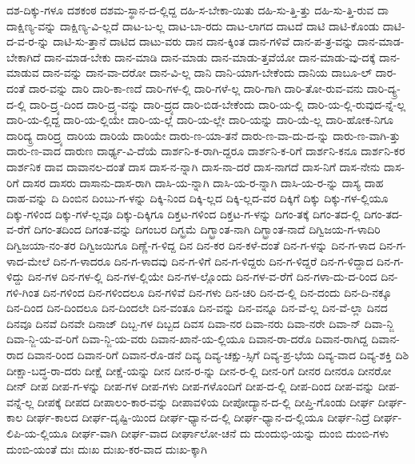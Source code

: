 {ದಶ-ದಿಕ್ಕು-ಗಳೂ
ದಶಕಂಠ
ದಶಮ-ಸ್ಥಾನ-ದ-ಲ್ಲಿದ್ದ
ದಹಿ-ಸ-ಬೇಕಾ-ಯಿತು
ದಹಿ-ಸು-ತ್ತಿ-ತ್ತು
ದಹಿ-ಸು-ತ್ತಿ-ರುವ
ದಾ
ದಾಕ್ಷಿಣ್ಯ-ವನ್ನು
ದಾಕ್ಷಿಣ್ಯ-ವಿ-ಲ್ಲದೆ
ದಾಟ-ಬ-ಲ್ಲ
ದಾಟ-ಬಾ-ರದು
ದಾಟ-ಲಾಗದ
ದಾಟದೆ
ದಾಟಿ
ದಾಟಿ-ಕೊಂಡು
ದಾಟಿ-ದ-ವ-ರ-ನ್ನು
ದಾಟಿ-ಸು-ತ್ತಾನೆ
ದಾಟಿದ
ದಾಟು-ವರು
ದಾನ
ದಾನ-ಕ್ಕಿಂತ
ದಾನ-ಗಳಿವೆ
ದಾನ-ಪ-ತ್ರ-ವನ್ನು
ದಾನ-ಮಾಡ-ಬೇಕಾಗಿದೆ
ದಾನ-ಮಾಡ-ಬೇಕು
ದಾನ-ಮಾಡಿ
ದಾನ-ಮಾಡು
ದಾನ-ಮಾಡು-ತ್ತವೆಯೋ
ದಾನ-ಮಾಡು-ವು-ದಕ್ಕೆ
ದಾನ-ಮಾಡುವ
ದಾನ-ವನ್ನು
ದಾನ-ವಾ-ದರೋ
ದಾನ-ವಿ-ಲ್ಲ
ದಾನಿ
ದಾನಿ-ಯಾಗ-ಬೇಕೆಂದು
ದಾನಿಯ
ದಾಬೂ-ಲ್
ದಾರ-ದಂತೆ
ದಾರ-ವನ್ನು
ದಾರಿ
ದಾರಿ-ಕಾ-ಣದೆ
ದಾರಿ-ಗಳ-ಲ್ಲಿ
ದಾರಿ-ಗಳೆ-ಲ್ಲ
ದಾರಿ-ಗಾಗಿ
ದಾರಿ-ತೋ-ರುವ-ವನು
ದಾರಿ-ದ್ಯ್ರ-ದ-ಲ್ಲಿ
ದಾರಿ-ದ್ರ್ಯ-ದಿಂದ
ದಾರಿ-ದ್ರ್ಯ-ವನ್ನು
ದಾರಿ-ದ್ರ್ಯದ
ದಾರಿ-ಬಿಡ-ಬೇಕೆಂದು
ದಾರಿ-ಯ-ಲ್ಲಿ
ದಾರಿ-ಯ-ಲ್ಲಿ-ರುವುದ-ನ್ನೆ-ಲ್ಲ
ದಾರಿ-ಯ-ಲ್ಲಿದ್ದ
ದಾರಿ-ಯ-ಲ್ಲಿಯೇ
ದಾರಿ-ಯ-ಲ್ಲೆ
ದಾರಿ-ಯ-ಲ್ಲೇ
ದಾರಿ-ಯನ್ನು
ದಾರಿ-ಯೆ-ಲ್ಲ
ದಾರಿ-ಹೋಕ-ನಿಗೂ
ದಾರಿದ್ಯ್ರ
ದಾರಿದ್ರ್ಯ
ದಾರಿಯ
ದಾರಿಯೆ
ದಾರಿಯೇ
ದಾರು-ಣ-ಯಾ-ತನೆ
ದಾರು-ಣ-ವಾ-ದು-ದ-ನ್ನು
ದಾರು-ಣ-ವಾಗಿ-ತ್ತು
ದಾರು-ಣ-ವಾದ
ದಾರುಣ
ದಾರ್ಢ್ಯ-ವಿ-ದೆಯೆ
ದಾರ್ಶನಿ-ಕ-ರಾಗಿ-ದ್ದರೂ
ದಾರ್ಶನಿ-ಕ-ರಿಗೆ
ದಾರ್ಶನಿ-ಕನೂ
ದಾರ್ಶನಿ-ಕರ
ದಾರ್ಶನಿಕ
ದಾವ
ದಾವಾನಲ-ದಂತೆ
ದಾಸ
ದಾಸ-ನ-ನ್ನಾಗಿ
ದಾಸ-ನಾ-ದರೆ
ದಾಸ-ನಾಗದೆ
ದಾಸ-ನಿಗೆ
ದಾಸ-ನೇನು
ದಾಸ-ರಿಗೆ
ದಾಸರ
ದಾಸರು
ದಾಸಾನು-ದಾಸ-ರಾಗಿ
ದಾಸಿ-ಯ-ನ್ನಾಗಿ
ದಾಸಿ-ಯ-ರ-ನ್ನಾಗಿ
ದಾಸಿ-ಯ-ರ-ನ್ನು
ದಾಸ್ಯ
ದಾಹ
ದಾಹ-ವನ್ನು
ದಿ
ದಿಂಬಿನ
ದಿಂಬು-ಗ-ಳನ್ನು
ದಿಕ್ಕಿ-ನಿಂದ
ದಿಕ್ಕಿ-ಲ್ಲದ
ದಿಕ್ಕಿ-ಲ್ಲದ-ವರ
ದಿಕ್ಕಿಗೆ
ದಿಕ್ಕು
ದಿಕ್ಕು-ಗಳ-ಲ್ಲಿಯೂ
ದಿಕ್ಕು-ಗಳಿಂದ
ದಿಕ್ಕು-ಗಳೆ-ಲ್ಲವೂ
ದಿಕ್ಕು-ದಿಕ್ಕಿಗೂ
ದಿಕ್ತಟ-ಗಳಿಂದ
ದಿಕ್ತಟ-ಗ-ಳನ್ನು
ದಿಗಂ-ತಕ್ಕೆ
ದಿಗಂ-ತದ-ಲ್ಲಿ
ದಿಗಂ-ತದ-ವ-ರೆಗೆ
ದಿಗಂ-ತದಿಂದ
ದಿಗಂತ-ವನ್ನು
ದಿಗಂಬರ
ದಿಗ್ಭ್ರಮೆ
ದಿಗ್ಭ್ರಾಂತ-ನಾಗಿ
ದಿಗ್ಭ್ರಾಂತ-ನಾದೆ
ದಿಗ್ವಿಜಯ-ಗ-ಳಾದಿರಿ
ದಿಗ್ವಿಜಯಾ-ನಂ-ತರ
ದಿಗ್ವಿಜಯಿಗೂ
ದಿಣ್ಣೆ-ಗ-ಳಿದ್ದ
ದಿನ
ದಿನ-ಕರ
ದಿನ-ಕಳೆ-ದಂತೆ
ದಿನ-ಗ-ಳನ್ನು
ದಿನ-ಗ-ಳಾದ
ದಿನ-ಗ-ಳಾದ-ಮೇಲೆ
ದಿನ-ಗ-ಳಾದರೂ
ದಿನ-ಗ-ಳಾದವು
ದಿನ-ಗ-ಳಿಗೆ
ದಿನ-ಗ-ಳಿದ್ದರು
ದಿನ-ಗ-ಳಿದ್ದರೆ
ದಿನ-ಗ-ಳಿದ್ದಾದ
ದಿನ-ಗ-ಳಿದ್ದು
ದಿನ-ಗಳ
ದಿನ-ಗಳ-ಲ್ಲಿ
ದಿನ-ಗಳ-ಲ್ಲಿಯೇ
ದಿನ-ಗಳ-ಲ್ಲೊಂದು
ದಿನ-ಗಳ-ವ-ರೆಗೆ
ದಿನ-ಗಳಾ-ದು-ದ-ರಿಂದ
ದಿನ-ಗಳಿ-ಗಿಂತ
ದಿನ-ಗಳಿಂದ
ದಿನ-ಗಳಿಂದಲೂ
ದಿನ-ಗಳಿವೆ
ದಿನ-ಗಳು
ದಿನ-ಚರಿ
ದಿನ-ದ-ಲ್ಲಿ
ದಿನ-ದಂದು
ದಿನ-ದಿ-ನಕ್ಕೂ
ದಿನ-ದಿಂದ
ದಿನ-ದಿಂದಲೂ
ದಿನ-ದಿಂದಲೇ
ದಿನ-ವಂತೂ
ದಿನ-ವನ್ನು
ದಿನ-ವನ್ನೂ
ದಿನ-ವೆ-ಲ್ಲ
ದಿನ-ವೆ-ಲ್ಲಾ
ದಿನದ
ದಿನವೂ
ದಿನವೆ
ದಿನವೇ
ದಿನಾಜ್
ದಿಬ್ಬ-ಗಳ
ದಿಬ್ಬದ
ದಿವಸ
ದಿವಾ-ನರ
ದಿವಾ-ನರು
ದಿವಾ-ನರೇ
ದಿವಾ-ನ್
ದಿವಾ-ನ್ಜಿ
ದಿವಾ-ನ್ಜಿ-ಯ-ವ-ರಿಗೆ
ದಿವಾ-ನ್ಜಿ-ಯ-ವರು
ದಿವಾನ-ಖಾನೆ-ಯ-ಲ್ಲಿಯೂ
ದಿವಾನ-ರಾ-ದರೊ
ದಿವಾನ-ರಾಗಿದ್ದ
ದಿವಾನ-ರಾದ
ದಿವಾನ-ರಿಂದ
ದಿವಾನ-ರಿಗೆ
ದಿವಾನ-ರೊ-ಡನೆ
ದಿವ್ಯ
ದಿವ್ಯ-ಚಕ್ಷು-ಸ್ಸಿಗೆ
ದಿವ್ಯ-ಪ್ರ-ಭೆಯ
ದಿವ್ಯ-ವಾದ
ದಿವ್ಯ-ಶಕ್ತಿ
ದಿಶಿ
ದೀಕ್ಷಾ-ಬದ್ಧ-ರಾ-ದರು
ದೀಕ್ಷೆ
ದೀಕ್ಷೆ-ಯನ್ನು
ದೀನ
ದೀನ-ರ-ನ್ನು
ದೀನ-ರ-ಲ್ಲಿ
ದೀನ-ರಿಗೆ
ದೀನರ
ದೀನರೂ
ದೀನರೋ
ದೀನ್
ದೀಪ
ದೀಪ-ಗ-ಳನ್ನು
ದೀಪ-ಗಳ
ದೀಪ-ಗಳು
ದೀಪ-ಗಳೊಂದಿಗೆ
ದೀಪ-ದ-ಲ್ಲಿ
ದೀಪ-ದಿಂದ
ದೀಪ-ವನ್ನು
ದೀಪ-ವನ್ನೆ-ಲ್ಲ
ದೀಪಕ್ಕೆ
ದೀಪದ
ದೀಪಾಲಂ-ಕಾರ-ವನ್ನು
ದೀಪಾವಳಿಯ
ದೀಪೋದ್ಯಾನ-ದ-ಲ್ಲಿ
ದೀಪ್ತಿ-ಗೊಂಡು
ದೀರ್ಘ
ದೀರ್ಘ-ಕಾಲ
ದೀರ್ಘ-ಕಾಲದ
ದೀರ್ಘ-ದೃಷ್ಟಿ-ಯಿಂದ
ದೀರ್ಘ-ಧ್ಯಾನ-ದ-ಲ್ಲಿ
ದೀರ್ಘ-ಧ್ಯಾನ-ದ-ಲ್ಲಿಯೂ
ದೀರ್ಘ-ನಿದ್ರೆ
ದೀರ್ಘ-ಲಿಪಿ-ಯ-ಲ್ಲಿಯೂ
ದೀರ್ಘ-ವಾಗಿ
ದೀರ್ಘ-ವಾದ
ದೀರ್ಘಾಲೋ-ಚನೆ
ದು
ದುಂದುಭಿ-ಯನ್ನು
ದುಂಬಿ
ದುಂಬಿ-ಗಳು
ದುಂಬಿ-ಯಂತೆ
ದುಃ
ದುಃಖ
ದುಃಖ-ಕರ-ವಾದ
ದುಃಖ-ಕ್ಕಾಗಿ
}
